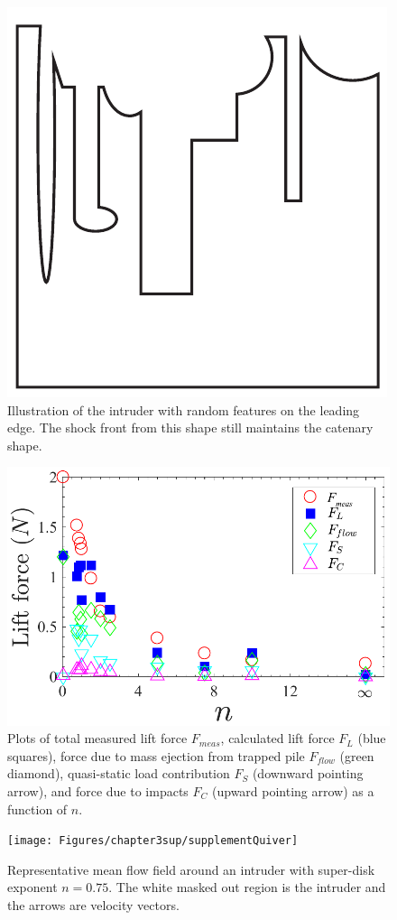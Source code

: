 \begin{figure}
	\includegraphics[width=\textwidth]{Figures/chapter3sup/randomShape}
	\caption{Illustration of the intruder with random features on the leading edge. The shock front from this shape still maintains the catenary shape.}
	\label{randomShape}
\end{figure}

\begin{figure}[h]
	\includegraphics[width=\textwidth]{Figures/chapter3sup/forcePlotSupplement}
	\caption{Plots of total measured lift force $F_{meas}$, calculated lift force $F_L$ (blue squares), force due to mass ejection from trapped pile $F_{flow}$ (green diamond), quasi-static load contribution $F_S$ (downward pointing arrow), and force due to impacts $F_C$ (upward pointing arrow) as a function of $n$.}
	\label{forcePlotSupplement}
\end{figure}

\begin{figure}
	\texttt{[image: Figures/chapter3sup/supplementQuiver]}
	\caption{Representative mean flow field around an intruder with super-disk exponent $n=0.75$. The white masked out region is the intruder and the arrows are velocity vectors.}
	\label{flowField}
\end{figure}